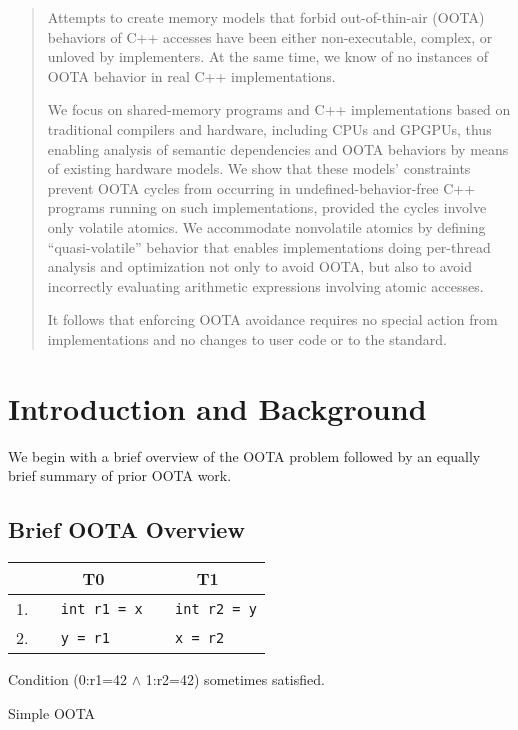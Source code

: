 \begin{abstract}
	Attempts to create memory models that forbid out-of-thin-air
	(OOTA) behaviors of C++  accesses
	have been either non-executable, complex, or unloved by
	implementers.
	At the same time, we know of no instances of OOTA behavior in real C++
	implementations.

	We focus on shared-memory programs and C++ implementations based
	on traditional compilers and hardware, including CPUs and GPGPUs,
	thus enabling analysis of semantic dependencies and OOTA behaviors
	by means of existing hardware models.
	We show that these models' constraints prevent OOTA cycles from
	occurring in undefined-behavior-free C++ programs running on
	such implementations, provided the cycles involve only volatile
	atomics.
	We accommodate nonvolatile atomics by defining ``quasi-volatile''
	behavior that enables implementations doing per-thread analysis
	and optimization not only to avoid OOTA, but also to avoid 
	incorrectly evaluating arithmetic expressions involving atomic
	accesses.

	It follows that enforcing OOTA avoidance requires no special
	action from implementations and no changes to user code or
	to the standard.
\end{abstract}
\maketitle{}

\section{Introduction and Background}
\label{sec:Introduction}

We begin with a brief overview of the OOTA problem followed by an equally
brief summary of prior OOTA work.

\subsection{Brief OOTA Overview}
\label{sec:Brief OOTA Overview}

\begin{listing}[bp]
{
\small
\begin{tabular}{r|l|l}
& \multicolumn{1}{c}{T0} & \multicolumn{1}{c}{T1} \\
\hline
1. &
\texttt{~~int r1 = x} &
	\texttt{~~int r2 = y} \\
2. &
\texttt{~~y = r1} &
	\texttt{~~x = r2} \\
\end{tabular}

\vspace{0.1in}
Condition (0:r1=42 $\wedge$ 1:r2=42)
sometimes satisfied.
}
\caption{Simple OOTA}
\label{lst:Simple OOTA}
\end{listing}

